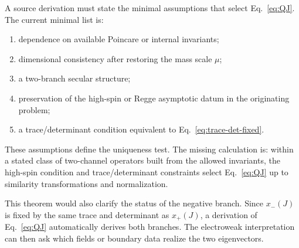 A source derivation must state the minimal assumptions that select Eq.~\eqref{eq:QJ}.  The current minimal list is:
\begin{enumerate}
\item dependence on available Poincare or internal invariants;
\item dimensional consistency after restoring the mass scale \(\mu\);
\item a two-branch secular structure;
\item preservation of the high-spin or Regge asymptotic datum in the originating problem;
\item a trace/determinant condition equivalent to Eq.~\eqref{eq:trace-det-fixed}.
\end{enumerate}
These assumptions define the uniqueness test.  The missing calculation is: within a stated class of two-channel operators built from the allowed invariants, the high-spin condition and trace/determinant constraints select Eq.~\eqref{eq:QJ} up to similarity transformations and normalization.

This theorem would also clarify the status of the negative branch.  Since \(x_-(J)\) is fixed by the same trace and determinant as \(x_+(J)\), a derivation of Eq.~\eqref{eq:QJ} automatically derives both branches.  The electroweak interpretation can then ask which fields or boundary data realize the two eigenvectors.
